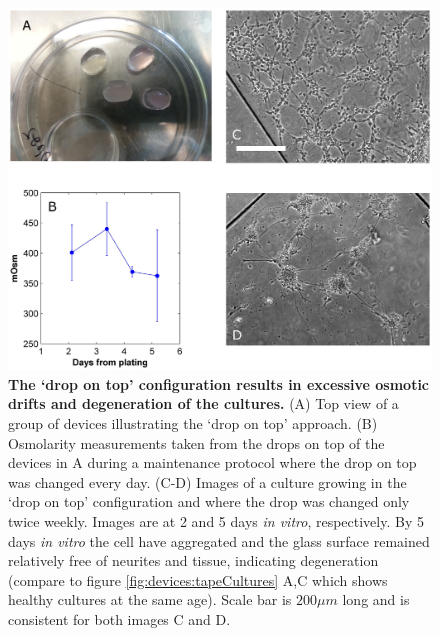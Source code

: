         \begin{figure}
           \centering
            \includegraphics[width=14.3cm]{chapter4/figures/osmIssue/osmIssue.jpg}
            \caption[Effects of osmolarity drift in early protocol for long term culturing of neurons in microfluidic devices]{\textbf{The `drop on top' configuration results in excessive osmotic drifts and degeneration of the cultures.} (A) Top view of a group of devices illustrating the `drop on top' approach. (B) Osmolarity measurements taken from the drops on top of the devices in A during a maintenance protocol where the drop on top was changed every day. (C-D) Images of a culture growing in the `drop on top' configuration and where the drop was changed only twice weekly. Images are at 2 and 5 days \textit{in vitro}, respectively. By 5 days \textit{in vitro} the cell have aggregated and the glass surface remained relatively free of neurites and tissue, indicating degeneration (compare to figure \ref{fig:devices:tapeCultures} A,C which shows healthy cultures at the same age). Scale bar is \(200 \mu m\) long and is consistent for both images C and D.}
            \label{fig:devices:osmIssue}
        \end{figure}

